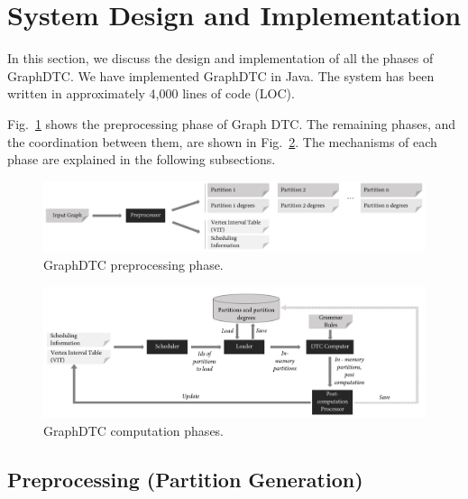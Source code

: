 \documentclass[10pt,preprint]{sigplanconf}
\begin{document}
\label{subsec:alt}

\section{System Design and Implementation}
\label{sec:design}

In this section, we discuss the design and implementation of all the phases of GraphDTC. We have implemented GraphDTC in Java. The system has been written in approximately 4,000 lines of code (LOC). 

Fig.~\ref{fig-ppphase} shows the preprocessing phase of Graph DTC. The remaining phases, and the coordination between them, are shown in Fig.~\ref{fig-compphases}. The mechanisms of each phase are explained in the following subsections. 


\begin{figure}[!htbp]
	\begin{center}
		\includegraphics[scale=0.5]{Figures/ppphase.pdf}
	\end{center}
	\caption{GraphDTC preprocessing phase.}
	\label{fig-ppphase}
\end{figure}

\begin{figure}[!htbp]
	\begin{center}
		\includegraphics[scale=0.50]{Figures/compphases.pdf}
	\end{center}
	\caption{GraphDTC computation phases.}
	\label{fig-compphases}
\end{figure}


\subsection{Preprocessing (Partition Generation)}
\label{subsec:pp}
\end{document}
